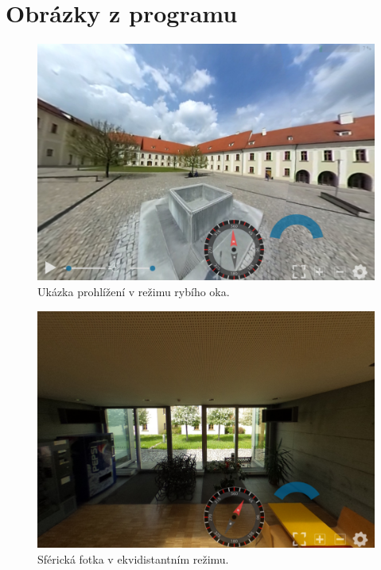  
\chapter{Obrázky z programu} %
\begin{figure}[h]
	\label{img:12}
	\centering
	\includegraphics[scale=1.0,angle=0,width=1.0\linewidth]{obrazky-figures/priloha_b1}
	\caption{Ukázka prohlížení v režimu rybího oka.}
\end{figure}

\newpage


\begin{figure}[h]
	\label{img:13}
	\centering
	\includegraphics[scale=1.0,angle=0,width=1.0\linewidth]{obrazky-figures/priloha_b2}
	\caption{Sférická fotka v ekvidistantním režimu.}
\end{figure}

